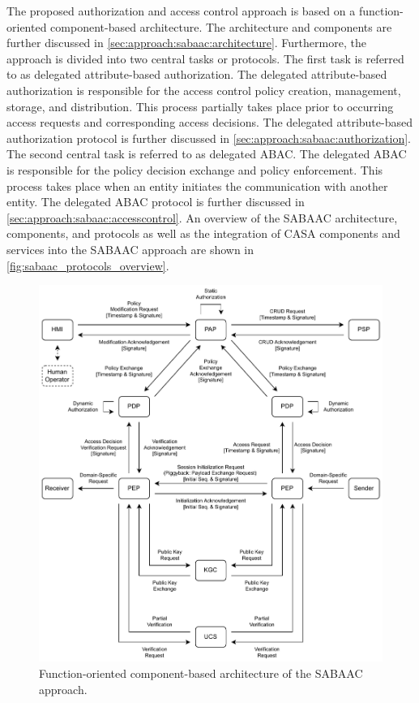 The proposed authorization and access control approach is based on a function-oriented component-based architecture.
The architecture and components are further discussed in \autoref{sec:approach:sabaac:architecture}.
Furthermore, the approach is divided into two central tasks or protocols.
The first task is referred to as delegated attribute-based authorization.
The delegated attribute-based authorization is responsible for the access control policy creation, management, storage, and distribution.
This process partially takes place prior to occurring access requests and corresponding access decisions.
The delegated attribute-based authorization protocol is further discussed in \autoref{sec:approach:sabaac:authorization}.
The second central task is referred to as delegated ABAC.
The delegated ABAC is responsible for the policy decision exchange and policy enforcement.
This process takes place when an entity initiates the communication with another entity.
The delegated ABAC protocol is further discussed in \autoref{sec:approach:sabaac:accesscontrol}.
An overview of the SABAAC architecture, components, and protocols as well as the integration of CASA components and services into the SABAAC approach are shown in \autoref{fig:sabaac_protocols_overview}.
\begin{figure}
    \centering
    \includegraphics[width=1.0\linewidth]{figures/SABAAC_protocols_overview.drawio.pdf}
    \caption{Function-oriented component-based architecture of the SABAAC approach.}
    \label{fig:sabaac_protocols_overview}
\end{figure}

